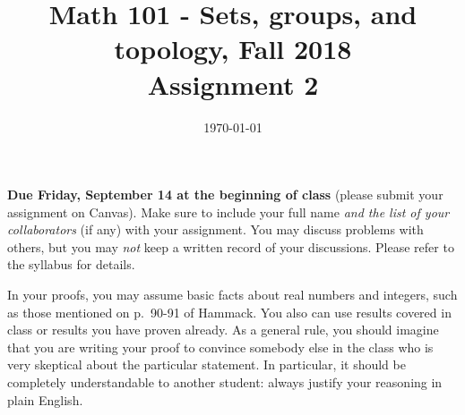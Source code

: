 \documentclass{amsart}
\title[Math 101, Fall 2018: assignment 2]{Math 101 - Sets, groups, and topology, Fall 2018 \\ Assignment 2}
\date{\today}
\theoremstyle{definition}
\begin{document}

\maketitle

\textbf{Due Friday, September 14 at the beginning of class} (please submit your assignment on Canvas). Make sure to include your full name \emph{and the list of your collaborators} (if any) with your assignment. You may discuss problems with others, but you may \emph{not} keep a written record of your discussions. Please refer to the syllabus for details.

In your proofs, you may assume basic facts about real numbers and integers, such as those mentioned on p.~90-91 of Hammack. You also can use results covered in class or results you have proven already. As a general rule, you should imagine that you are writing your proof to convince somebody else in the class who is very skeptical about the particular statement. In particular, it should be completely understandable to another student: always justify your reasoning in plain English. 
\end{document}
